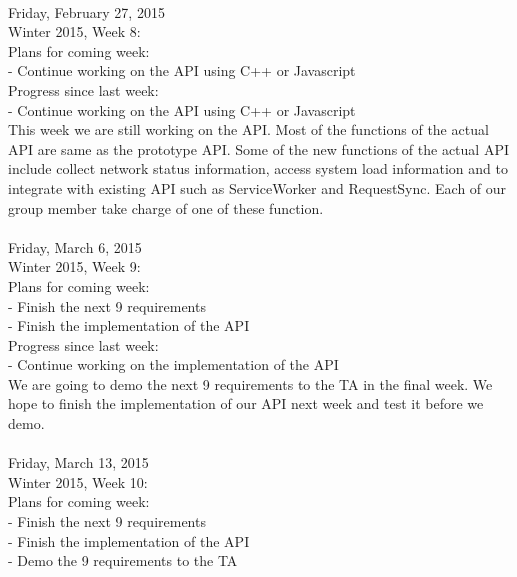 {\hrulefill \\
Friday, February 27, 2015 \\
Winter 2015, Week 8: \\

Plans for coming week: \\
- Continue working on the API using C++ or Javascript \\

Progress since last week: \\
- Continue working on the API using C++ or Javascript \\

This week we are still working on the API. Most of the functions of the actual API are same as the prototype API. Some of the new functions of the actual API include collect network status information, access system load information and to integrate with existing API such as ServiceWorker and RequestSync. Each of our group member take charge of one of these function. \\

\hrulefill \\
Friday, March 6, 2015 \\
Winter 2015, Week 9: \\

Plans for coming week: \\
- Finish the next 9 requirements \\
- Finish the implementation of the API \\

Progress since last week: \\
- Continue working on the implementation of the API \\

We are going to demo the next 9 requirements to the TA in the final week. We hope to finish the implementation of our API next week and test it before we demo. \\

\hrulefill \\
Friday, March 13, 2015 \\
Winter 2015, Week 10: \\

Plans for coming week: \\
- Finish the next 9 requirements \\
- Finish the implementation of the API \\
- Demo the 9 requirements to the TA \\

}
